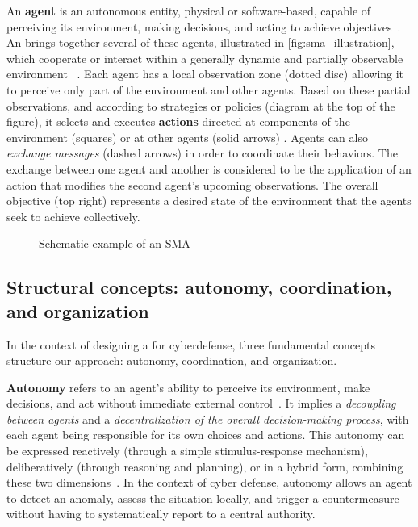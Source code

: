An \textbf{agent} is an autonomous entity, physical or software-based, capable of perceiving its environment, making decisions, and acting to achieve objectives~\cite{Russell2010}. An  brings together several of these agents, illustrated in \autoref{fig:sma_illustration}, which cooperate or interact within a generally dynamic and partially observable environment~\cite{Jennings1998,Shoham2007} . Each agent has a local observation zone (dotted disc) allowing it to perceive only part of the environment and other agents. Based on these partial observations, and according to strategies or policies (diagram at the top of the figure), it selects and executes \textbf{actions} directed at components of the environment (squares) or at other agents (solid arrows) . Agents can also \emph{exchange messages} (dashed arrows) in order to coordinate their behaviors. The exchange between one agent and another is considered to be the application of an action that modifies the second agent's upcoming observations. The overall objective (top right) represents a desired state of the environment that the agents seek to achieve collectively.

\begin{figure}[h]
  \centering
  \resizebox{\textwidth}{!}{%
    
  }
  \caption{Schematic example of an SMA}
  \label{fig:sma_illustration}
\end{figure}

\subsection*{Structural concepts: autonomy, coordination, and organization}

In the context of designing a  for cyberdefense, three fundamental concepts structure our approach: autonomy, coordination, and organization.

\textbf{Autonomy} refers to an agent's ability to perceive its environment, make decisions, and act without immediate external control~\cite{Russell2010, Boissier2003}. It implies a \textit{decoupling between agents} and a \textit{decentralization of the overall decision-making process}, with each agent being responsible for its own choices and actions. This autonomy can be expressed reactively (through a simple stimulus-response mechanism), deliberatively (through reasoning and planning), or in a hybrid form, combining these two dimensions~\cite {Georgeff1987}. In the context of cyber defense, autonomy allows an agent to detect an anomaly, assess the situation locally, and trigger a countermeasure without having to systematically report to a central authority.

